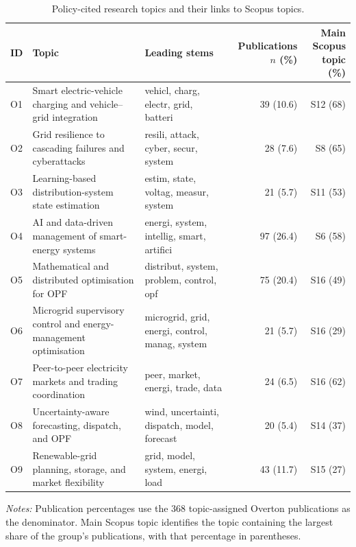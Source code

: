 \documentclass[a4paper,fleqn]{cas-sc}
\begin{document}
    \begin{table}[htbp]
    \centering
    \caption{Policy-cited research topics and their links to Scopus topics.}
    \label{tab:opf_policy_topics}
    \scriptsize
    \setlength{\tabcolsep}{3pt}
    \renewcommand{\arraystretch}{1.10}
    \begin{tabularx}{\textwidth}{
    l
    >{\raggedright\arraybackslash}X
    >{\raggedright\arraybackslash}X
    rr}
    \toprule
    ID & Topic & Leading stems
    & \shortstack{Publications\\$n$ (\%)}
    & \shortstack{Main Scopus\\topic (\%)} \\
    \midrule
    
    O1 & Smart electric-vehicle charging and vehicle--grid integration
    & vehicl, charg, electr, grid, batteri
    & 39 (10.6) & S12 (68) \\
    
    O2 & Grid resilience to cascading failures and cyberattacks
    & resili, attack, cyber, secur, system
    & 28 (7.6) & S8 (65) \\
    
    O3 & Learning-based distribution-system state estimation
    & estim, state, voltag, measur, system
    & 21 (5.7) & S11 (53) \\
    
    O4 & AI and data-driven management of smart-energy systems
    & energi, system, intellig, smart, artifici
    & 97 (26.4) & S6 (58) \\
    
    O5 & Mathematical and distributed optimisation for OPF
    & distribut, system, problem, control, opf
    & 75 (20.4) & S16 (49) \\
    
    O6 & Microgrid supervisory control and energy-management optimisation
    & microgrid, grid, energi, control, manag, system
    & 21 (5.7) & S16 (29) \\
    
    O7 & Peer-to-peer electricity markets and trading coordination
    & peer, market, energi, trade, data
    & 24 (6.5) & S16 (62) \\
    
    O8 & Uncertainty-aware forecasting, dispatch, and OPF
    & wind, uncertainti, dispatch, model, forecast
    & 20 (5.4) & S14 (37) \\
    
    O9 & Renewable-grid planning, storage, and market flexibility
    & grid, model, system, energi, load
    & 43 (11.7) & S15 (27) \\
    
    \bottomrule
    \end{tabularx}
    \par\smallskip
    \begin{minipage}{\textwidth}
    \footnotesize
    \textit{Notes:} Publication percentages use the 368 topic-assigned Overton publications as the denominator. Main Scopus topic identifies the topic containing the largest share of the group's publications, with that percentage in parentheses.
    \end{minipage}
    \end{table}
    
\end{document}
